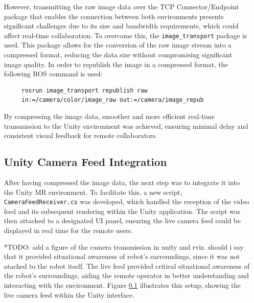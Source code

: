 However, transmitting the raw image data over the \ac{TCP} Connector/Endpoint package that enables the connection between both environments presents significant challenges due to its size and bandwidth requirements, which could affect real-time collaboration.
To overcome this, the \texttt{image\_transport} package is used. This package allows for the conversion of the raw image stream into a compressed format, reducing the data size without compromising significant image quality. In order to republish the image in a compressed format, the following \ac{ROS} command is used:

\begin{verbatim}
     rosrun image_transport republish raw 
     in:=/camera/color/image_raw out:=/camera/image_repub 
\end{verbatim}

By compressing the image data, smoother and more efficient real-time transmission to the Unity environment was achieved, ensuring minimal delay and consistent visual feedback for remote collaborators.

\subsection{Unity Camera Feed Integration}

After having compressed the image data, the next step was to integrate it into the Unity \ac{MR} environment. To facilitate this, a new script, \texttt{CameraFeedReceiver.cs} was developed, which handled the reception of the video feed and its subsequent rendering within the Unity application. The script was then attached to a designated \ac{UI} panel, ensuring the live camera feed could be displayed in real time for the remote users. 

*TODO: add a figure of the camera transmission in unity and rviz. should i say that it provided situational awareness of robot's surroundings, since it was not atached to the robot itself. 
The live feed provided critical situational awareness of the robot’s surroundings, aiding the remote operator in better understanding and interacting with the environment. Figure \ref{} illustrates this setup, showing the live camera feed within the Unity interface.






